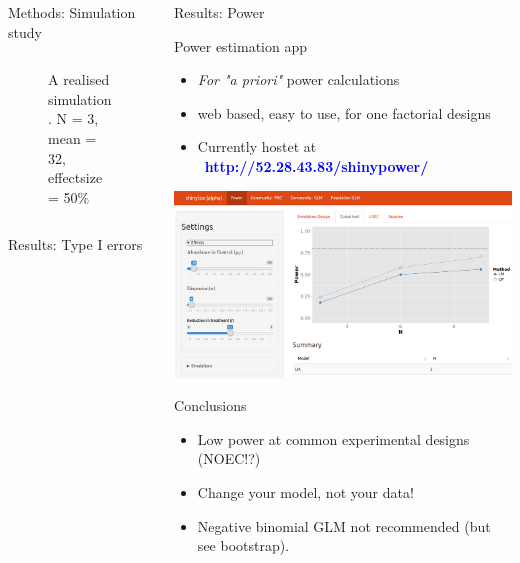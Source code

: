 \documentclass[final,t]{beamer}
\begin{document}
\begin{frame}{}
\begin{columns}[t]
\begin{column}{.48\linewidth}
\begin{block}{Methods: Simulation study}
\begin{columns}[T]
\begin{column}{.48\linewidth}
\begin{figure}
             \caption{A realised simulation. N = 3, mean  = 32, effectsize = 50\%}
             \end{figure}
        \end{column}
        \end{columns}
    \end{block}

    \begin{block}{Results: Type I errors}
    \end{block}

\end{column}


\begin{column}{.48\linewidth}

    \begin{block}{Results: Power}
    \end{block}


    \begin{block}{Power estimation app}
    \begin{itemize}
        \item \emph{For "a priori"} power calculations
        \item web based, easy to use, for one factorial designs
        \item Currently hostet at \faGlobe~\textbf{\textcolor{blue}{http://52.28.43.83/shinypower/}}
    \end{itemize}
        \begin{center}
          \includegraphics[width=0.7\linewidth]{fig/shinytox.png}
        \end{center}
    \end{block}
  
    \begin{alertblock}{Conclusions}
        \begin{itemize}
            \item Low power at common experimental designs (NOEC!?)
            \item Change your model, not your data!
            \item Negative binomial GLM not recommended (but see bootstrap).
        \end{itemize}
    \end{alertblock}


\end{column}
\end{columns}
\end{frame}
\end{document}
